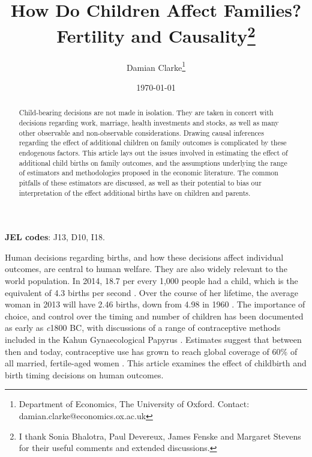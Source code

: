\documentclass{article}
\title{How Do Children Affect Families?\\ Fertility and Causality\thanks{I thank
    Sonia Bhalotra, Paul Devereux, James Fenske and Margaret Stevens for their
    useful comments and extended discussions.}}
\author{Damian Clarke\thanks{Department of Economics, The University of Oxford.
Contact: damian.clarke@economics.ox.ac.uk}}
\date{\today}
\begin{document}
\maketitle
%
\begin{spacing}{1.4}
\begin{abstract}
Child-bearing decisions are not made in isolation.  They are taken in concert 
with decisions regarding work, marriage, health investments and stocks, as well 
as many other observable and non-observable considerations.  Drawing causal 
inferences regarding the effect of additional children on family outcomes is
complicated by these endogenous factors.  This article lays out the issues
involved in estimating the effect of additional child births on family outcomes,
and the assumptions underlying the range of estimators and methodologies
proposed in the economic literature.  The common pitfalls of these estimators
are discussed, as well as their potential to bias our interpretation of the
effect additional births have on children and parents.
\end{abstract}
\hspace{7mm} \textbf{JEL codes}: J13, D10, I18.

\vspace{7mm}
Human decisions regarding births, and how these decisions affect individual 
outcomes, are central to human welfare.  They are also widely relevant to the
world population.  In 2014, 18.7 per every 1,000 people had a child, which is 
the equivalent of 4.3 births per second \citep{CIA2014}. Over the course of her 
lifetime, the average woman in 2013 will have 2.46 births, down from 4.98 in 
1960 \citep{WorldBank2015}. The importance of choice, and control over the 
timing and number of children has been documented as early as \emph{c}1800 BC, 
with discussions of a range of contraceptive methods included in the Kahun 
Gynaecological Papyrus \citep{OdowdPhillip1994}.  Estimates suggest that 
between then and today, contraceptive use has grown to reach global coverage
of 60\% of all married, fertile-aged women \citep{Darroch2013}. This article
examines the effect of childbirth and birth timing decisions on human outcomes.



\end{spacing}
\end{document}
